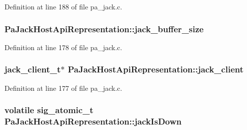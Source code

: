 Definition at line 188 of file pa\+\_\+jack.\+c.

\subsubsection[{\texorpdfstring{jack\+\_\+buffer\+\_\+size}{jack_buffer_size}}]{ Pa\+Jack\+Host\+Api\+Representation\+::jack\+\_\+buffer\+\_\+size}\hypertarget{struct_pa_jack_host_api_representation_a4cef17ffae2034e74e82a44c7526c5ca}{}\label{struct_pa_jack_host_api_representation_a4cef17ffae2034e74e82a44c7526c5ca}


Definition at line 178 of file pa\+\_\+jack.\+c.

\subsubsection[{\texorpdfstring{jack\+\_\+client}{jack_client}}]{\setlength{\rightskip}{0pt plus 5cm}jack\+\_\+client\+\_\+t$\ast$ Pa\+Jack\+Host\+Api\+Representation\+::jack\+\_\+client}\hypertarget{struct_pa_jack_host_api_representation_a42d2cc0802246a6829096862bddd9123}{}\label{struct_pa_jack_host_api_representation_a42d2cc0802246a6829096862bddd9123}


Definition at line 177 of file pa\+\_\+jack.\+c.

\subsubsection[{\texorpdfstring{jack\+Is\+Down}{jackIsDown}}]{\setlength{\rightskip}{0pt plus 5cm}volatile sig\+\_\+atomic\+\_\+t Pa\+Jack\+Host\+Api\+Representation\+::jack\+Is\+Down}\hypertarget{struct_pa_jack_host_api_representation_aae228468d5b858e77f0d6ff432dc35d0}{}\label{struct_pa_jack_host_api_representation_aae228468d5b858e77f0d6ff432dc35d0}


